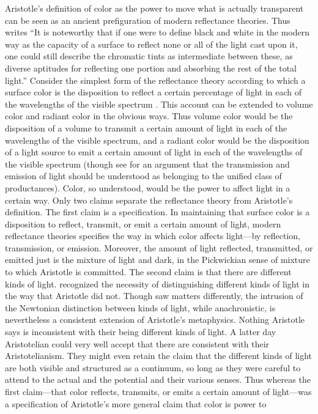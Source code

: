 Aristotle's definition of color as the power to move what is actually transparent can be seen as an ancient prefiguration of modern reflectance theories. Thus \citet[23]{Ross:1906fk} writes ``It is noteworthy that if one were to define black and white in the modern way as the capacity of a surface to reflect none or all of the light cast upon it, one could still describe the chromatic tints as intermediate between these, as diverse aptitudes for reflecting one portion and absorbing the rest of the total light.'' Consider the simplest form of the reflectance theory according to which a surface color is the disposition to reflect a certain percentage of light in each of the wavelengths of the visible spectrum \citep[see][]{Hilbert:1987jq}. This account can be extended to volume color and radiant color in the obvious ways. Thus volume color would be the disposition of a volume to transmit a certain amount of light in each of the wavelengths of the visible spectrum, and a radiant color would be the disposition of a light source to emit a certain amount of light in each of the wavelengths of the visible spectrum (though see \citealt{Byrne:2003we} for an argument that the transmission and emission of light should be understood as belonging to the unified class of productances). Color, so understood, would be the power to affect light in a certain way. Only two claims separate the reflectance theory from Aristotle's definition. The first claim is a specification. In maintaining that surface color is a disposition to reflect, transmit, or emit a certain amount of light, modern reflectance theories specifies the way in which color affects light---by reflection, transmission, or emission. Moreover, the amount of light reflected, transmitted, or emitted just is the mixture of light and dark, in the Pickwickian sense of mixture to which Aristotle is committed. The second claim is that there are different kinds of light. \citet{Newton:1704qv} recognized the necessity of distinguishing different kinds of light in the way that Aristotle did not. Though \citet{Goethe:1810uq} saw matters differently, the intrusion of the Newtonian distinction between kinds of light, while anachronistic, is nevertheless a consistent extension of Aristotle's metaphysics. Nothing Aristotle says is inconsistent with their being different kinds of light. A latter day Aristotelian could very well accept that there are consistent with their Aristotelianism. They might even retain the claim that the different kinds of light are both visible and structured as a continuum, so long as they were careful to attend to the actual and the potential and their various senses. Thus whereas the first claim---that color reflects, transmits, or emits a certain amount of light---was a specification of Aristotle's more general claim that color is power to 